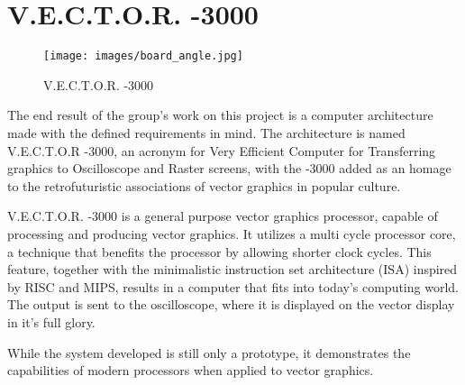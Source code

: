 \chapter{V.E.C.T.O.R. -3000}

\begin{figure}[H]
    \centering \texttt{[image: images/board\_angle.jpg]}
    \caption{V.E.C.T.O.R. -3000}
    \label{fig:board-angle}
\end{figure}

The end result of the group's work on this project is a computer architecture made with the defined requirements in mind.
The architecture is named V.E.C.T.O.R -3000, an acronym for Very Efficient Computer for Transferring graphics to Oscilloscope and Raster screens, with the -3000 added as an homage to the retrofuturistic associations of vector graphics in popular culture.

V.E.C.T.O.R. -3000 is a general purpose vector graphics processor, capable of processing and producing vector graphics. 
It utilizes a multi cycle processor core, a technique that benefits the processor by allowing shorter clock cycles.
This feature, together with the minimalistic instruction set architecture (ISA) inspired by RISC\cite{risc} and MIPS\cite{mips}, results in a computer that fits into today's computing world.
The output is sent to the oscilloscope, where it is displayed on the vector display in it's full glory.

While the system developed is still only a prototype, it demonstrates the capabilities of modern processors when applied to vector graphics. 



